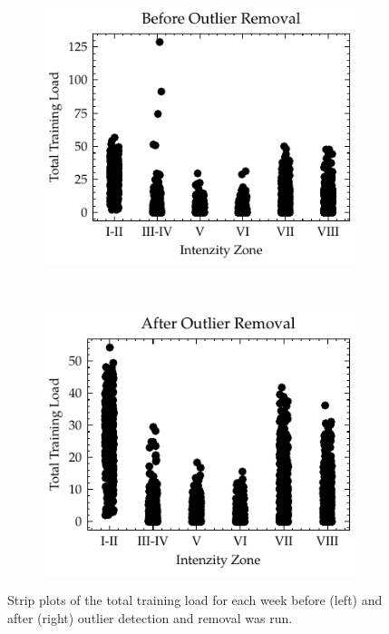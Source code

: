 \begin{figure}[ht]
    \centering
    \begin{subfigure}[t]{0.48\textwidth}
        \centering
        \includegraphics[width=\textwidth]{chapters/figures/implementation_plots/before_outlier_removal.pdf}
    \end{subfigure}%
    ~ 
    \begin{subfigure}[t]{0.48\textwidth}
        \centering
        \includegraphics[width=\textwidth]{chapters/figures/implementation_plots/after_outlier_removal.pdf}
    \end{subfigure}
        \caption{Strip plots of the total training load for each week before (left) and after (right) outlier detection and removal was run.}
    \label{fig:outlier_motivation}
\end{figure}


